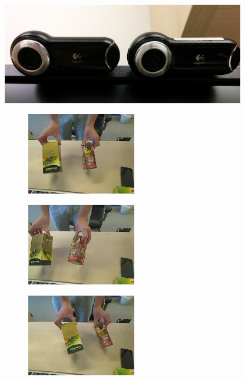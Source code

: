 \begin{figure}[t!]
\centering
\includegraphics[width=300pt]{figures/scene1_camerapose.jpg}
\caption{Kamerák helyzete az első jelenetnél \label{fig:scene1_camerapose}}

\vspace{10pt}

\begin{subfigure}[b]{.32\linewidth}
	\centering
	\includegraphics[width=135pt]{figures/left_93.png}
  \end{subfigure}
\begin{subfigure}[b]{.32\linewidth}
	\centering
	\includegraphics[width=135pt]{figures/left_153.png}
  \end{subfigure}
\begin{subfigure}[b]{.32\linewidth}
	\centering
	\includegraphics[width=135pt]{figures/left_223.png}
  \end{subfigure}\\\vspace{5pt}

\end{figure}
